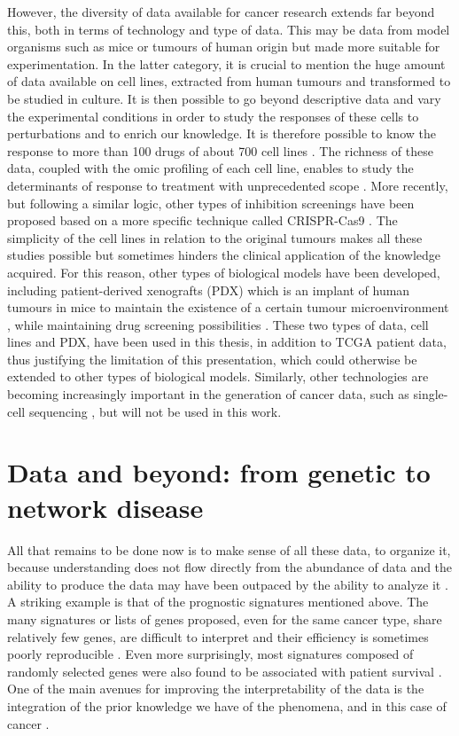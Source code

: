 \documentclass[a4paper,12pt,twoside,onecolumn,openright,final,oldfontcommands]{memoir}
\begin{document}
However, the diversity of data available for cancer research extends far
beyond this, both in terms of technology and type of data. This may be
data from model organisms such as mice or tumours of human origin but
made more suitable for experimentation. In the latter category, it is
crucial to mention the huge amount of data available on cell lines,
extracted from human tumours and transformed to be studied in culture.
It is then possible to go beyond descriptive data and vary the
experimental conditions in order to study the responses of these cells
to perturbations and to enrich our knowledge. It is therefore possible
to know the response to more than 100 drugs of about 700 cell lines
\citep{yang2012genomics}. The richness of these data, coupled with the
omic profiling of each cell line, enables to study the determinants of
response to treatment with unprecedented scope
\citep{iorio2016landscape}. More recently, but following a similar
logic, other types of inhibition screenings have been proposed based on
a more specific technique called CRISPR-Cas9
\citep{behan2019prioritization}. The simplicity of the cell lines in
relation to the original tumours makes all these studies possible but
sometimes hinders the clinical application of the knowledge acquired.
For this reason, other types of biological models have been developed,
including patient-derived xenografts (PDX) which is an implant of human
tumours in mice to maintain the existence of a certain tumour
microenvironment \citep{hidalgo2014patient}, while maintaining drug
screening possibilities \citep{gao2015high}. These two types of data,
cell lines and PDX, have been used in this thesis, in addition to TCGA
patient data, thus justifying the limitation of this presentation, which
could otherwise be extended to other types of biological models.
Similarly, other technologies are becoming increasingly important in the
generation of cancer data, such as single-cell sequencing
\citep{navin2015first}, but will not be used in this work.

\section{Data and beyond: from genetic to network
disease}\label{data-and-beyond-from-genetic-to-network-disease}

All that remains to be done now is to make sense of all these data, to
organize it, because understanding does not flow directly from the
abundance of data and the ability to produce the data may have been
outpaced by the ability to analyze it \citep{stadler2014cancer}. A
striking example is that of the prognostic signatures mentioned above.
The many signatures or lists of genes proposed, even for the same cancer
type, share relatively few genes, are difficult to interpret and their
efficiency is sometimes poorly reproducible \citep{domany2014using}.
Even more surprisingly, most signatures composed of randomly selected
genes were also found to be associated with patient survival
\citep{venet2011most}. One of the main avenues for improving the
interpretability of the data is the integration of the prior knowledge
we have of the phenomena, and in this case of cancer
\citep{domany2014using}.
\end{document}
